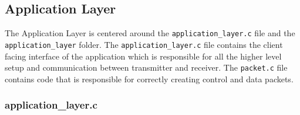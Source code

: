 \documentclass[11pt,a4paper]{article}
\begin{document}
\subsection{Application Layer}

The Application Layer is centered around the \lstinline{application_layer.c} file and the \lstinline{application_layer} folder.
The \lstinline{application_layer.c} file contains the client facing interface of the application which is responsible for all the higher level setup and communication between transmitter and receiver.
The \lstinline{packet.c} file contains code that is responsible for correctly creating control and data packets.

\subsubsection{application\_layer.c}
\end{document}
